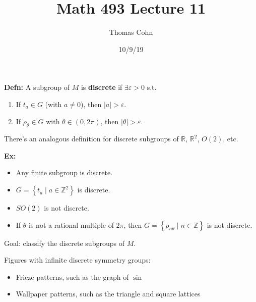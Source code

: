 \documentclass[10pt,letterpaper]{article}
\author{Thomas Cohn}
\title{Math 493 Lecture 11}
\date{10/9/19} %
\newcommand{\n}{\hfill\break}
\newcommand{\hangblock}[2]{\par\noindent\settowidth{\hangindent}{\textbf{#1: }}\textbf{#1: }\!\!\!#2}
\newcommand{\defn}[1]{\hangblock{Defn}{#1}}
\newcommand{\ex}[1]{\hangblock{Ex}{#1}}
\newcommand{\set}[1]{\left\{#1\right\}}
\newcommand{\integers}{\mathbb{Z}}
\newcommand{\Z}{\integers}
\newcommand{\reals}{\mathbb{R}}
\newcommand{\R}{\reals}
\newcommand{\abs}[1]{\left|#1\right|}
\newcommand{\st}{s.t.}
\begin{document}
\maketitle
\setlength\RaggedRightParindent{\parindent}
\RaggedRight

\defn{
	A subgroup of $M$ is \textbf{discrete} if $\exists\varepsilon>0$ \st{}
	\begin{enumerate}[label=\arabic*),leftmargin=4\parindent]
		\item If $t_{a}\in{}G$ (with $a\ne{}0$), then $\abs{a}>\varepsilon$.
		\item If $\rho_{\theta}\in{}G$ with $\theta\in(0,2\pi)$, then $\abs{\theta}>\varepsilon$.
	\end{enumerate}
}

\par\noindent
There's an analogous definition for discrete subgroups of $\R$, $\R^{2}$, $O(2)$, etc.\n

\ex{
	\begin{itemize}[leftmargin=2\parindent]
		\item Any finite subgroup is discrete.
		\item $G=\set{t_{a}\mid{}a\in\Z^{2}}$ is discrete.
		\item $SO(2)$ is not discrete.
		\item If $\theta$ is not a rational multiple of $2\pi$, then $G=\set{\rho_{n\theta}\mid{}n\in\Z}$ is not discrete.
	\end{itemize}
}

\par\noindent
Goal: classify the discrete subgroups of $M$.\n

\par\noindent
Figures with infinite discrete symmetry groups:
\begin{itemize}
	\item Frieze patterns, such as the graph of $\sin$
	\item Wallpaper patterns, such as the triangle and square lattices
\end{itemize}
\end{document}
